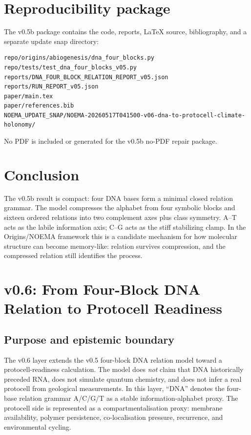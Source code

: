 \documentclass[11pt]{article}
\begin{document}
\section{Reproducibility package}
The v0.5b package contains the code, reports, LaTeX source, bibliography, and a separate update snap directory:
\begin{verbatim}
repo/origins/abiogenesis/dna_four_blocks.py
repo/tests/test_dna_four_blocks_v05.py
reports/DNA_FOUR_BLOCK_RELATION_REPORT_v05.json
reports/RUN_REPORT_v05.json
paper/main.tex
paper/references.bib
NOEMA_UPDATE_SNAP/NOEMA-20260517T041500-v06-dna-to-protocell-climate-holonomy/
\end{verbatim}
No PDF is included or generated for the v0.5b no-PDF repair package.

\section{Conclusion}
The v0.5b result is compact: four DNA bases form a minimal closed relation grammar. The model compresses the alphabet from four symbolic blocks and sixteen ordered relations into two complement axes plus class symmetry. A--T acts as the labile information axis; C--G acts as the stiff stabilizing clamp. In the Origins/NOEMA framework this is a candidate mechanism for how molecular structure can become memory-like: relation survives compression, and the compressed relation still identifies the process.




\section{v0.6: From Four-Block DNA Relation to Protocell Readiness}

\subsection{Purpose and epistemic boundary}
The v0.6 layer extends the v0.5 four-block DNA relation model toward a protocell-readiness calculation. The model does \emph{not} claim that DNA historically preceded RNA, does not simulate quantum chemistry, and does not infer a real protocell from geological measurements. In this layer, ``DNA'' denotes the four-base relation grammar A/C/G/T as a stable information-alphabet proxy. The protocell side is represented as a compartmentalisation proxy: membrane availability, polymer persistence, co-localisation pressure, recurrence, and environmental cycling.
\end{document}
